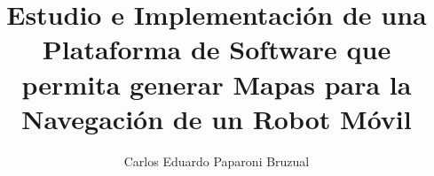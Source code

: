 \documentclass[12pt,oneside]{book}
\begin{document}
\frontmatter






\title{Estudio e Implementación de una Plataforma de Software que permita generar Mapas para la Navegación de un Robot Móvil}

\author{Carlos Eduardo Paparoni Bruzual}





\end{document}

